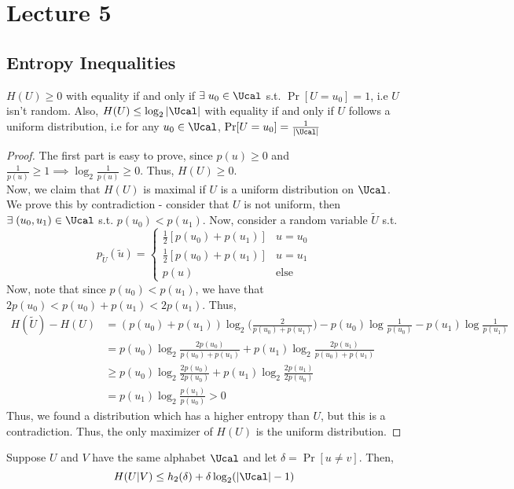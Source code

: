 \chapter{Lecture 5}
\section{Entropy Inequalities}
\begin{theorem}
$H(U) \geq 0$ with equality if and only if $\exists\; u_0 \in \Ucal$ s.t. $\Pr[U=u_0]=1$, i.e $U$ isn't random. Also, $H(U) \leq \log_2 |\Ucal|$ with equality if and only if $U$ follows a uniform distribution, i.e for any $u_0 \in \Ucal$, $\Pr[U=u_0] = \frac{1}{|\Ucal|}$
\end{theorem}
\begin{proof}
The first part is easy to prove, since $p(u) \geq 0$ and $\frac{1}{p(u)} \geq 1 \implies \log_2 \frac{1}{p(u)} \geq 0$. Thus, $H(U) \geq 0$. \\
Now, we claim that $H(U)$ is maximal if $U$ is a uniform distribution on $\Ucal$. \\
We prove this by contradiction - consider that $U$ is not uniform, then $\exists\; (u_0, u_1) \in \Ucal$ s.t. $p(u_0) < p(u_1)$. Now, consider a random variable $\widetilde U$ s.t.
\[ 
p_{\widetilde U}(\widetilde u) = \begin{cases}
\frac{1}{2}[p(u_0) + p(u_1)] & u = u_0 \\
\frac{1}{2}[p(u_0) + p(u_1)] & u = u_1 \\
p(u)  &\text{else}
\end{cases}
\]
Now, note that since $p(u_0) < p(u_1)$, we have that $2p(u_0) < p(u_0) + p(u_1) < 2p(u_1)$. Thus,
\begin{align*}
    H(\widetilde U) - H(U) &= (p(u_0) + p(u_1)) \log_2 \bigg(\frac{2}{p(u_0) + p(u_1)}\bigg) - p(u_0)\log\frac{1}{p(u_0)} - p(u_1) \log\frac{1}{p(u_1)} \\
    &= p(u_0)\log_2 \frac{2p(u_0)}{p(u_0) + p(u_1)} + p(u_1)\log_2 \frac{2p(u_1)}{p(u_0) + p(u_1)} \\
    &\geq p(u_0) \log_2 \frac{2p(u_0)}{2p(u_0)} + p(u_1)\log_2 \frac{2p(u_1)}{2p(u_0)} \\
    &= p(u_1) \log_2 \frac{p(u_1)}{p(u_0)} > 0
\end{align*}
Thus, we found a distribution which has a higher entropy than $U$, but this is a contradiction. Thus, the only maximizer of $H(U)$ is the uniform distribution.
\end{proof}
\begin{theorem}
Suppose $U$ and $V$ have the same alphabet $\Ucal$ and let $\delta= \Pr[u \neq v]$. Then, 
\[ H(U|V) \leq h_2(\delta) + \delta \log_2(|\Ucal| - 1)\]
\end{theorem}
